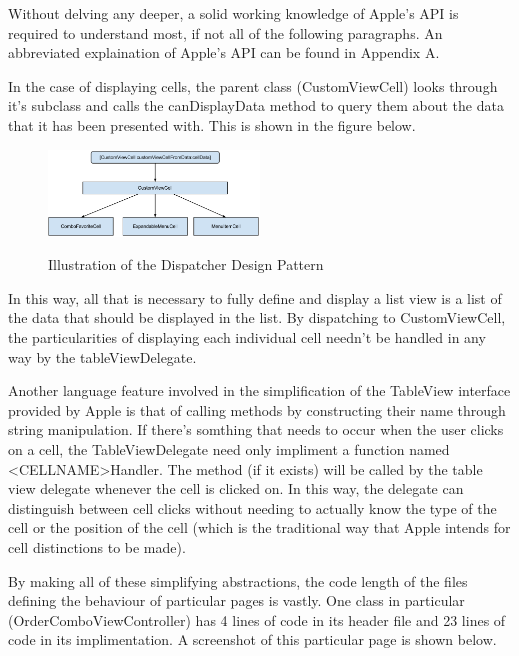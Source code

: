 \documentclass[se]{uw-wkrpt}
\begin{document}
Without delving any deeper, a solid working knowledge of Apple's API is required to understand
most, if not all of the following paragraphs. An abbreviated explaination of Apple's API can 
be found in Appendix A.

In the case of displaying cells, the parent class (CustomViewCell) looks through it's subclass
and calls the canDisplayData method to query them about the data that it has been presented with.
This is shown in the figure below.

\begin{figure}[h!]
  \caption{Illustration of the Dispatcher Design Pattern}
  \centering
    \includegraphics[width=0.5\textwidth]{customViewCellFlowchart}
  \label{fig:Dispatcher Pattern}
\end{figure}

In this way, all that is necessary to fully define and display a list view is a list of the data
that should be displayed in the list. By dispatching to CustomViewCell, the particularities of
displaying each individual cell needn't be handled in any way by the tableViewDelegate. 

Another language feature involved in the simplification of the TableView interface provided
by Apple is that of calling methods by constructing their name through string manipulation.
If there's somthing that needs to occur when the user clicks on a cell, the TableViewDelegate
need only impliment a function named <CELLNAME>Handler. The method (if it exists) will be called
by the table view delegate whenever the cell is clicked on. In this way, the delegate can 
distinguish between cell clicks without needing to actually know the type of the cell or the
position of the cell (which is the traditional way that Apple intends for cell distinctions to
be made). 

By making all of these simplifying abstractions, the code length of the files defining
the behaviour of particular pages is vastly. One class in particular (OrderComboViewController)
has 4 lines of code in its header file and 23 lines of code in its implimentation. A screenshot
of this particular page is shown below. 
\end{document}
